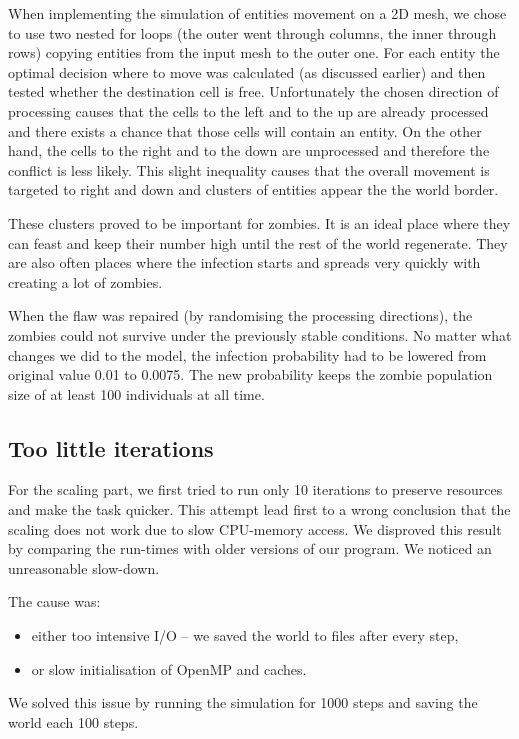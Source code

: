 \documentclass[a4paper]{article}
\begin{document}
When implementing the simulation of entities movement on a 2D mesh, we chose to use two nested for loops (the outer went through columns, the inner through rows) copying entities from the input mesh to the outer one.
For each entity the optimal decision where to move was calculated (as discussed earlier) and then tested whether the destination cell is free.
Unfortunately the chosen direction of processing causes that the cells to the left and to the up are already processed and there exists a chance that those cells will contain an entity.
On the other hand, the cells to the right and to the down are unprocessed and therefore the conflict is less likely.
This slight inequality causes that the overall movement is targeted to right and down and clusters of entities appear the the world border.

These clusters proved to be important for zombies.
It is an ideal place where they can feast and keep their number high until the rest of the world regenerate.
They are also often places where the infection starts and spreads very quickly with creating a lot of zombies.

When the flaw was repaired (by randomising the processing directions), the zombies could not survive under the previously stable conditions.
No matter what changes we did to the model, the infection probability had to be lowered from original value 0.01 to 0.0075.
The new probability keeps the zombie population size of at least 100 individuals at all time.

\subsection{Too little iterations}

For the scaling part, we first tried to run only 10 iterations to preserve resources and make the task quicker.
This attempt lead first to a wrong conclusion that the scaling does not work due to slow CPU-memory access.
We disproved this result by comparing the run-times with older versions of our program.
We noticed an unreasonable slow-down.

The cause was:
\begin{itemize}
\item either too intensive I/O -- we saved the world to files after every step,
\item or slow initialisation of OpenMP and caches.
\end{itemize}

We solved this issue by running the simulation for 1000 steps and saving the world each 100 steps.
\end{document}

